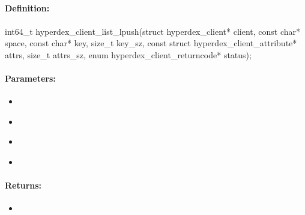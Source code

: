 \pagebreak
\subsection{}
\label{api:c:list_lpush}


\paragraph{Definition:}
\begin{ccode}
int64_t hyperdex_client_list_lpush(struct hyperdex_client* client,
        const char* space,
        const char* key, size_t key_sz,
        const struct hyperdex_client_attribute* attrs, size_t attrs_sz,
        enum hyperdex_client_returncode* status);
\end{ccode}

\paragraph{Parameters:}
\begin{itemize}[noitemsep]
\item {}\\

\item {}\\

\item {}\\

\item {}\\

\end{itemize}

\paragraph{Returns:}
\begin{itemize}[noitemsep]
\item {}\\

\end{itemize}

